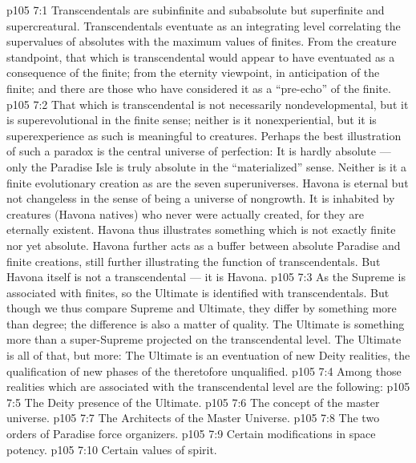 \vs p105 7:1 Transcendentals are subinfinite and subabsolute but superfinite and supercreatural. Transcendentals eventuate as an integrating level correlating the supervalues of absolutes with the maximum values of finites. From the creature standpoint, that which is transcendental would appear to have eventuated as a consequence of the finite; from the eternity viewpoint, in anticipation of the finite; and there are those who have considered it as a “pre\hyp{}echo” of the finite.
\vs p105 7:2 That which is transcendental is not necessarily nondevelopmental, but it is superevolutional in the finite sense; neither is it nonexperiential, but it is superexperience as such is meaningful to creatures. Perhaps the best illustration of such a paradox is the central universe of perfection: It is hardly absolute --- only the Paradise Isle is truly absolute in the “materialized” sense. Neither is it a finite evolutionary creation as are the seven superuniverses. Havona is eternal but not changeless in the sense of being a universe of nongrowth. It is inhabited by creatures (Havona natives) who never were actually created, for they are eternally existent. Havona thus illustrates something which is not exactly finite nor yet absolute. Havona further acts as a buffer between absolute Paradise and finite creations, still further illustrating the function of transcendentals. But Havona itself is not a transcendental --- it is Havona.
\vs p105 7:3 As the Supreme is associated with finites, so the Ultimate is identified with transcendentals. But though we thus compare Supreme and Ultimate, they differ by something more than degree; the difference is also a matter of quality. The Ultimate is something more than a super\hyp{}Supreme projected on the transcendental level. The Ultimate is all of that, but more: The Ultimate is an eventuation of new Deity realities, the qualification of new phases of the theretofore unqualified.
\vs p105 7:4 \pc Among those realities which are associated with the transcendental level are the following:
\vs p105 7:5 \bibnobreakspace The Deity presence of the Ultimate.
\vs p105 7:6 \bibnobreakspace The concept of the master universe.
\vs p105 7:7 \bibnobreakspace The Architects of the Master Universe.
\vs p105 7:8 \bibnobreakspace The two orders of Paradise force organizers.
\vs p105 7:9 \bibnobreakspace Certain modifications in space potency.
\vs p105 7:10 \bibnobreakspace Certain values of spirit.

